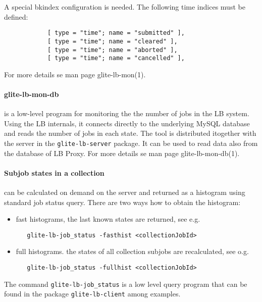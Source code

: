 A special bkindex configuration is needed. 
The following time indices must be defined:
\begin{verbatim}
            [ type = "time"; name = "submitted" ],
            [ type = "time"; name = "cleared" ],
            [ type = "time"; name = "aborted" ],
            [ type = "time"; name = "cancelled" ],
\end{verbatim}
For more details se man page glite-lb-mon(1).


\paragraph{glite-lb-mon-db} is a low-level program for monitoring the the
number of jobs in the LB system. Using the LB internals, it connects directly
to the underlying MySQL database and reads the number of jobs in each state.
The tool is distributed itogether with the server in the \verb'glite-lb-server' package.
It can be used to read data also from the database of LB Proxy.
For more details se man page glite-lb-mon-db(1).


\paragraph{Subjob states in a collection} can be calculated on demand on the server and
returned as a histogram using standard job status query. There are two ways how to obtain the 
histogram:
\begin{itemize}
\item fast histograms, the last known states are returned, see e.g.
\begin{verbatim}
   glite-lb-job_status -fasthist <collectionJobId>
\end{verbatim}
\item full histograms. the states of all collection subjobs are recalculated, see o.g.
\begin{verbatim}
   glite-lb-job_status -fullhist <collectionJobId>
\end{verbatim}
\end{itemize}
The command \verb'glite-lb-job_status' is a low level query program that can be
found in the package \verb'glite-lb-client' among examples.





